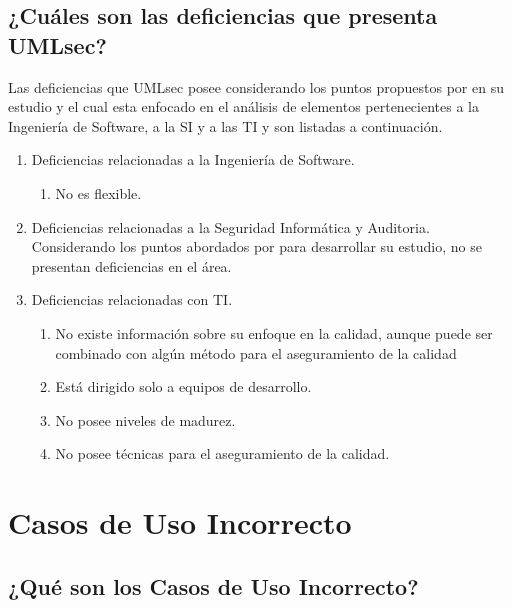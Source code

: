 \documentclass[runningheads,a4paper]{llncs}
\begin{document}
\subsection{¿Cuáles son las deficiencias que presenta \gls{UMLsec}?}
Las deficiencias que \gls{UMLsec} posee considerando los puntos propuestos por \cite{BenchmarkingSDLCLAPS} en su estudio y el cual esta enfocado en el análisis de elementos pertenecientes a la Ingeniería de \gls{Software}, a la \gls{SI} y a las \gls{TI} y son listadas a continuación.

\begin{enumerate}
	\item Deficiencias relacionadas a la Ingeniería de \gls{Software}.
		\begin{enumerate}
			\item No es flexible.\\
			
		\end{enumerate}
	\item Deficiencias relacionadas a la Seguridad Informática y Auditoria.\\
	
Considerando los puntos abordados por \cite{BenchmarkingSDLCLAPS} para desarrollar su estudio, no se presentan deficiencias en el área. \\
						
	\item Deficiencias relacionadas con \gls{TI}.
		\begin{enumerate}
			\item No existe información sobre su enfoque en la calidad, aunque puede ser combinado con algún método para el aseguramiento de la calidad
			\item Está dirigido solo a equipos de desarrollo.
			\item No posee niveles de madurez.
			\item No posee técnicas para el aseguramiento de la calidad.
		\end{enumerate}
		
\end{enumerate}

\section{Casos de Uso Incorrecto}

\subsection{¿Qué son los Casos de Uso Incorrecto?}
\end{document}
